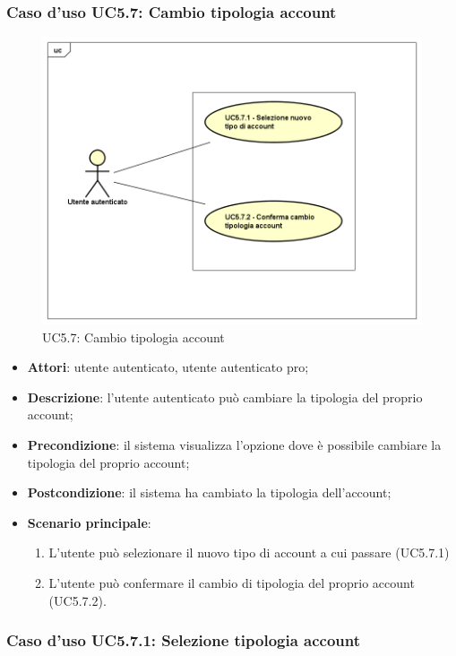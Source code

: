 \subsubsection{Caso d'uso UC5.7: Cambio tipologia account}
\label{UC5.7}
\begin{figure}[h]
	\centering
	\includegraphics[scale=0.5,keepaspectratio]{UML/UC5_7.png}
	\caption{UC5.7: Cambio tipologia account}
\end{figure}

\begin{itemize}
	\item \textbf{Attori}: utente autenticato, utente autenticato pro;
	\item \textbf{Descrizione}: l'utente autenticato può cambiare la tipologia del proprio account; 
	\item \textbf{Precondizione}: il sistema visualizza l'opzione dove è possibile cambiare la tipologia del proprio account;
	\item \textbf{Postcondizione}: il sistema ha cambiato la tipologia dell'account;
	\item \textbf{Scenario principale}:
	\begin{enumerate}
		\item L'utente può selezionare il nuovo tipo di account a cui passare (UC5.7.1)
		\item L'utente può confermare il cambio di tipologia del proprio account (UC5.7.2).
	\end{enumerate}
\end{itemize}

\subsubsection{Caso d'uso UC5.7.1: Selezione tipologia account}

